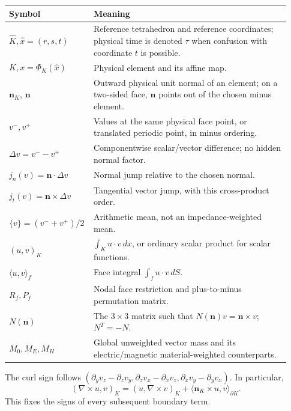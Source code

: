 \documentclass[11pt,a4paper]{article}
\newcommand{\n}{\mathbf n}
\newcommand{\curl}{\nabla\times}
\newcommand{\ip}[2]{\left(#1,#2\right)}
\begin{document}
\begin{longtable}{p{0.24\linewidth}p{0.69\linewidth}}
\toprule Symbol & Meaning\\\midrule
\(\widehat K,\widehat x=(r,s,t)\) & Reference tetrahedron and reference coordinates; physical time is denoted \(\tau\) when confusion with coordinate \(t\) is possible.\\
\(K,x=\Phi_K(\widehat x)\) & Physical element and its affine map.\\
\(\n_K\), \(\n\) & Outward physical unit normal of an element; on a two-sided face, \(\n\) points out of the chosen minus element.\\
\(v^-,v^+\) & Values at the same physical face point, or translated periodic point, in minus ordering.\\
\(\Delta v=v^--v^+\) & Componentwise scalar/vector difference; no hidden normal factor.\\
\(j_n(v)=\n\cdot\Delta v\) & Normal jump relative to the chosen normal.\\
\(j_t(v)=\n\times\Delta v\) & Tangential vector jump, with this cross-product order.\\
\(\{v\}=(v^-+v^+)/2\) & Arithmetic mean, not an impedance-weighted mean.\\
\(\ip{u}{v}_K\) & \(\int_K u\cdot v\,dx\), or ordinary scalar product for scalar functions.\\
\(\langle u,v\rangle_f\) & Face integral \(\int_f u\cdot v\,dS\).\\
\(R_f,P_f\) & Nodal face restriction and plus-to-minus permutation matrix.\\
\(N(\n)\) & The \(3\times3\) matrix such that \(N(\n)v=\n\times v\); \(N^T=-N\).\\
\(M_0,M_E,M_H\) & Global unweighted vector mass and its electric/magnetic material-weighted counterparts.\\
\bottomrule
\end{longtable}
The curl sign follows
\((\partial_y v_z-\partial_z v_y,\partial_z v_x-\partial_x v_z,
\partial_x v_y-\partial_y v_x)\). In particular,
\begin{equation}\label{eq:curlgreen}
 (\curl u,v)_K=(u,\curl v)_K+\langle\n_K\times u,v\rangle_{\partial K}.
\end{equation}
This fixes the signs of every subsequent boundary term.
\end{document}
